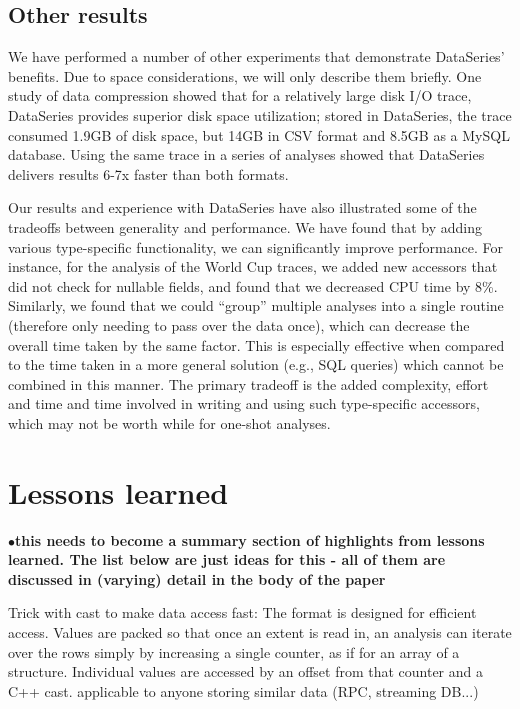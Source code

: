 \documentclass{acm_proc_article-sp}
\newcommand{\fix}[1]{{\LARGE\ensuremath{\bullet}}\textbf{#1}}
\begin{document}
\subsection{Other results}\label{sec:otherresults}

We have performed a number of other experiments that demonstrate
DataSeries' benefits. Due to space considerations, we will only
describe them briefly. One study of data compression showed that for a
relatively large disk I/O trace, DataSeries provides superior disk
space utilization; stored in DataSeries, the trace consumed 1.9GB of
disk space, but 14GB in CSV format and 8.5GB as a MySQL
database. Using the same trace in a series of analyses showed that
DataSeries delivers results 6-7x faster than both formats.

Our results and experience with DataSeries have also illustrated some
of the tradeoffs between generality and performance. We have found
that by adding various type-specific functionality, we can
significantly improve performance. For instance, for the analysis of
the World Cup traces, we added new accessors that did not check for
nullable fields, and found that we decreased CPU time by
8\%. Similarly, we found that we could ``group'' multiple analyses
into a single routine (therefore only needing to pass over the data
once), which can decrease the overall time taken by the same
factor. This is especially effective when compared to the time taken
in a more general solution (e.g., SQL queries) which cannot be combined
in this manner. The primary tradeoff is the added complexity, effort
and time and time involved in writing and using such type-specific
accessors, which may not be worth while for one-shot analyses.


\iffalse

\section{Lessons learned}\label{sec:lessonslearned}

\fix{this needs to become a summary section of highlights from lessons
learned. The list below are just ideas for this - all of them are discussed
in (varying) detail in the body of the paper}

Trick with cast to make data access fast: The format is designed for
efficient access. Values are packed so that once an extent is read in,
an analysis can iterate over the rows simply by increasing a single
counter, as if for an array of a structure.  Individual values are
accessed by an offset from that counter and a C++ cast.  applicable to
anyone storing similar data (RPC, streaming DB...)
\end{document}
